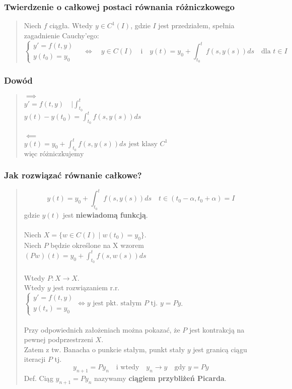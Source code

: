 \documentclass[10pt,a4paper]{article}
\begin{document}
{\subsubsection*{Twierdzenie o całkowej postaci równania różniczkowego}
\begin{quote}
Niech $f$ ciągła. Wtedy $y \in C^1(I)$, gdzie $I$ jest przedziałem, spełnia zagadnienie Cauchy'ego:\\
$$\begin{cases} y' = f(t,y) \\ y(t_0) = y_0 \end{cases} \quad \iff \quad y \in C(I) \quad \text{i} \quad y(t) = y_0 + \int_{t_0}^{t} f(s,y(s)) ds \quad \text{dla } t \in I$$
\end{quote}

\subsubsection*{Dowód}
\begin{quote}
$\implies$\\
$y'=f(t,y) \quad | \int_{t_0}^t$\\
$y(t) - y(t_0) = \int_{t_0}^t f(s,y(s)) ds$\\\\
$\impliedby$ \\
$y(t) = y_0 + \int_{t_0}^t f(s,y(s)) ds \text{ jest klasy } C^1$\\
$\text{więc różniczkujemy}$
\end{quote}

\subsubsection*{Jak rozwiązać równanie całkowe?}
\begin{quote}
$$y(t) = y_0 + \int_{t_0}^{t} f(s,y(s)) ds \quad t \in (t_0 - \alpha, t_0 + \alpha) = I$$
gdzie $y(t)$ jest \textbf{niewiadomą funkcją}.\\\\
Niech $X = \{ w \in C(I) \mid w(t_0) = y_0 \}$. \\
Niech $P$ będzie określone na X wzorem $(Pw)(t) = y_0 + \int_{t_0}^{t} f(s,w(s)) ds$\\\\
Wtedy $P: X \to X$.\\
Wtedy $y$ jest rozwiązaniem r.r. $\begin{cases} y' = f(t,y) \\ y(t_s) = y_0 \end{cases} \iff y \text{ jest pkt. stałym } P \text{ tj. } y = Py$. \\\\
Przy odpowiednich założeniach można pokazać, że $P$ jest kontrakcją na pewnej podprzestrzeni $X$.\\
Zatem z tw. Banacha o punkcie stałym, punkt stały $y$ jest granicą ciągu iteracji $P$ tj.
$$y_{n+1} = P y_n \quad \text{i wtedy} \quad y_n \to y \quad \text{gdy } y = Py$$
Def. Ciąg $y_{n+1} = P y_n$ nazywamy \textbf{ciągiem przybliżeń Picarda}.
\end{quote}

}
\end{document}
